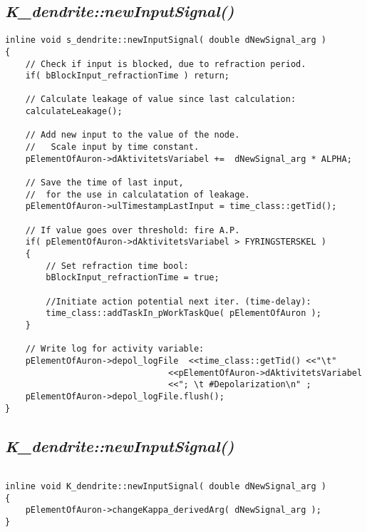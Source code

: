 \subsection{\emph{K\_dendrite::newInputSignal()}}
\label{appendixNewInputSignalDendrite}
\begin{lstlisting}
inline void s_dendrite::newInputSignal( double dNewSignal_arg )
{
	// Check if input is blocked, due to refraction period.
 	if( bBlockInput_refractionTime ) return;

	// Calculate leakage of value since last calculation:
	calculateLeakage();

	// Add new input to the value of the node.
	//   Scale input by time constant.
	pElementOfAuron->dAktivitetsVariabel +=  dNewSignal_arg * ALPHA;

	// Save the time of last input, 
	// 	for the use in calculatation of leakage.
	pElementOfAuron->ulTimestampLastInput = time_class::getTid();

	// If value goes over threshold: fire A.P.
	if( pElementOfAuron->dAktivitetsVariabel > FYRINGSTERSKEL )
	{
		// Set refraction time bool:
		bBlockInput_refractionTime = true;

		//Initiate action potential next iter. (time-delay):
		time_class::addTaskIn_pWorkTaskQue( pElementOfAuron );
	}

	// Write log for activity variable:
	pElementOfAuron->depol_logFile 	<<time_class::getTid() <<"\t" 
								<<pElementOfAuron->dAktivitetsVariabel 
								<<"; \t #Depolarization\n" ;
	pElementOfAuron->depol_logFile.flush();
}

\end{lstlisting}


\subsection{\emph{K\_dendrite::newInputSignal()}}
\begin{lstlisting}

inline void K_dendrite::newInputSignal( double dNewSignal_arg )
{
	pElementOfAuron->changeKappa_derivedArg( dNewSignal_arg );
}
\end{lstlisting}


